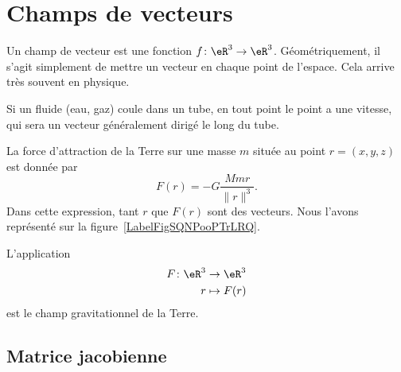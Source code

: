 \section{Champs de vecteurs}

Un champ de vecteur est une fonction $f\colon \eR^3\to \eR^3$. Géométriquement, il s'agit simplement de mettre un vecteur en chaque point de l'espace. Cela arrive très souvent en physique.

\begin{example}
    Si un fluide (eau, gaz) coule dans un tube, en tout point le point a une vitesse, qui sera un vecteur généralement dirigé le long du tube.
\end{example}

\begin{example}
    La force d'attraction de la Terre sur une masse $m$ située au point $r=(x,y,z)$ est donnée par
    \begin{equation}
        F(r)=-G\frac{ Mmr }{ \| r \|^3 }.
    \end{equation}
    Dans cette expression, tant $r$ que $F(r)$ sont des vecteurs. Nous l'avons représenté sur la figure~\ref{LabelFigSQNPooPTrLRQ}. %
\newcommand{\CaptionFigSQNPooPTrLRQ}{Le champ de gravitation de la Terre.}


    L'application
    \begin{equation}
        \begin{aligned}
            F\colon \eR^3&\to \eR^3 \\
            r&\mapsto F(r)
        \end{aligned}
    \end{equation}
    est le champ gravitationnel de la Terre.

\end{example}

\subsection{Matrice jacobienne}

